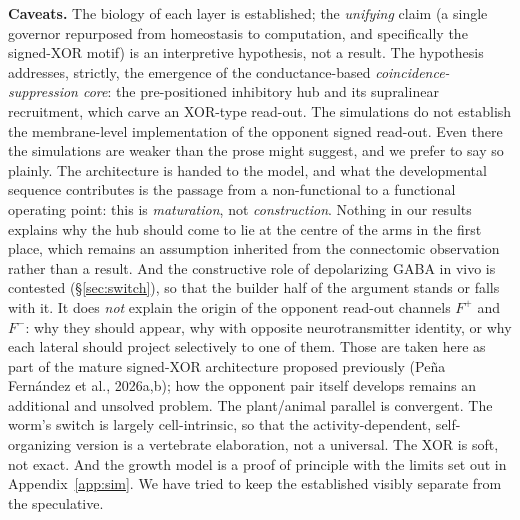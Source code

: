 \documentclass[11pt,a4paper]{article}
\begin{document}
\textbf{Caveats.} The biology of each layer is established; the \emph{unifying} claim (a single governor repurposed from homeostasis to computation, and specifically the signed-XOR motif) is an interpretive hypothesis, not a result. The hypothesis addresses, strictly, the emergence of the conductance-based \emph{coincidence-suppression core}: the pre-positioned inhibitory hub and its supralinear recruitment, which carve an XOR-type read-out. The simulations do not establish the membrane-level implementation of the opponent signed read-out. Even there the simulations are weaker than the prose might suggest, and we prefer to say so plainly. The architecture is handed to the model, and what the developmental sequence contributes is the passage from a non-functional to a functional operating point: this is \emph{maturation}, not \emph{construction}. Nothing in our results explains why the hub should come to lie at the centre of the arms in the first place, which remains an assumption inherited from the connectomic observation rather than a result. And the constructive role of depolarizing GABA in vivo is contested (\S\ref{sec:switch}), so that the builder half of the argument stands or falls with it. It does \emph{not} explain the origin of the opponent read-out channels $F^{+}$ and $F^{-}$: why they should appear, why with opposite neurotransmitter identity, or why each lateral should project selectively to one of them. Those are taken here as part of the mature signed-XOR architecture proposed previously (Pe\~na Fern\'andez et al., 2026a,b); how the opponent pair itself develops remains an additional and unsolved problem. The plant/animal parallel is convergent. The worm's switch is largely cell-intrinsic, so that the activity-dependent, self-organizing version is a vertebrate elaboration, not a universal. The XOR is soft, not exact. And the growth model is a proof of principle with the limits set out in Appendix~\ref{app:sim}. We have tried to keep the established visibly separate from the speculative.
\end{document}
